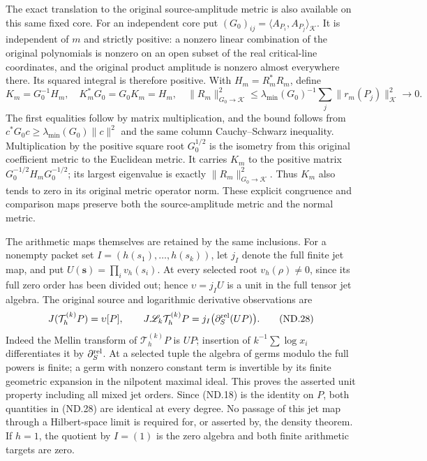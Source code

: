 The exact translation to the original source-amplitude metric is also
available on this same fixed core. For an independent core put
\((G_0)_{ij}=\langle A_{P_i},A_{P_j}\rangle_{\mathscr K}\).
It is independent of \(m\) and strictly positive: a nonzero linear
combination of the original polynomials is nonzero on an open subset
of the real critical-line coordinates, and the original product
amplitude is nonzero almost everywhere there. Its squared integral
is therefore positive. With \(H_m=R_m^*R_m\), define
\[
 K_m=G_0^{-1}H_m,\quad K_m^*G_0=G_0K_m=H_m,\quad
 \|R_m\|_{G_0\to\mathscr K}^2
 \le\lambda_{\min}(G_0)^{-1}
                \sum_j\|r_m(P_j)\|_{\mathscr K}^2\longrightarrow0.
\]
The first equalities follow by matrix multiplication, and the bound
follows from \(c^*G_0c\ge\lambda_{\min}(G_0)\|c\|^2\) and
the same column Cauchy--Schwarz inequality. Multiplication by the
positive square root \(G_0^{1/2}\) is the isometry from this original
coefficient metric to the Euclidean metric. It carries \(K_m\) to
the positive matrix \(G_0^{-1/2}H_mG_0^{-1/2}\); its largest
eigenvalue is exactly \(\|R_m\|_{G_0\to\mathscr K}^2\).
Thus \(K_m\) also tends to zero in its original metric operator
norm. These explicit congruence and comparison maps preserve both
the source-amplitude metric and the normal metric.

The arithmetic maps themselves are retained by the same inclusions.
For a nonempty packet set
\(I=(h(s_1),\ldots,h(s_k))\), let \(j_I\) denote the full finite
jet map, and put \(U(\mathbf s)=\prod_i v_h(s_i)\).
At every selected root \(v_h(\rho)\ne0\), since its full zero
order has been divided out; hence \(\upsilon=j_IU\) is a unit
in the full tensor jet algebra. The original source and logarithmic
derivative observations are
\[
 J(\mathcal T_h^{(k)}P)=\upsilon[P],\qquad
 J\mathscr L_k\mathcal T_h^{(k)}P
              =j_I\bigl(\partial_S^{\rm rel}(UP)\bigr).
 \tag{ND.28}
\]
Indeed the Mellin transform of \(\mathcal T_h^{(k)}P\) is \(UP\);
insertion of \(k^{-1}\sum\log x_i\) differentiates it by
\(\partial_S^{\rm rel}\). At a selected tuple the algebra of
germs modulo the full powers is finite; a germ with nonzero constant
term is invertible by its finite geometric expansion in the nilpotent
maximal ideal. This proves the asserted unit property including all
mixed jet orders. Since (ND.18) is the identity on \(P\), both
quantities in (ND.28) are identical at every degree. No passage of
this jet map through a Hilbert-space limit is required for, or asserted
by, the density theorem. If \(h=1\), the quotient by \(I=(1)\)
is the zero algebra and both finite arithmetic targets are zero.

